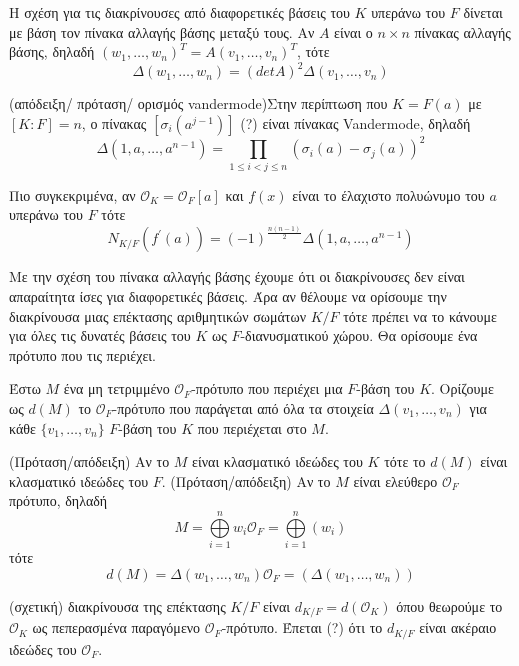 \documentclass[oneside,a4paper]{article}
\newcommand {\tl}{\textlatin}
\begin{document}
Η σχέση για τις διακρίνουσες από διαφορετικές βάσεις του $K$ υπεράνω του $F$ δίνεται με βάση τον πίνακα αλλαγής βάσης μεταξύ τους. Αν $A$ είναι ο $n\times n$ πίνακας αλλαγής βάσης, δηλαδή $(w_1,\ldots,w_n)^T = A (v_1,\ldots,v_n)^T$, τότε $$\Delta(w_1,\ldots,w_n) = (detA)^2 \Delta(v_1,\ldots,v_n)$$


(απόδειξη/ πρόταση/ ορισμός \tl{vandermode})Στην περίπτωση που $K = F(a)$ με $[K:F]=n$, ο πίνακας $[\sigma_i (a^{j-1})]$ (?) είναι πίνακας \tl{Vandermode}, δηλαδή
$$\Delta(1,a,\ldots,a^{n-1}) = \prod\limits_{1\leq i < j \leq n} \left(\sigma_i (a) - \sigma_j (a)\right)^2$$


Πιο συγκεκριμένα, αν $\mathcal{O}_K = \mathcal{O}_F [a]$ και $f(x)$ είναι το έλαχιστο πολυώνυμο του $a$ υπεράνω του $F$ τότε $$N_{K/F} (f^{\prime}(a)) = (-1)^{\frac{n(n-1)}2}\Delta(1,a,\ldots,a^{n-1})$$

Με την σχέση του πίνακα αλλαγής βάσης έχουμε ότι οι διακρίνουσες δεν είναι απαραίτητα ίσες για διαφορετικές βάσεις. Άρα αν θέλουμε να ορίσουμε την διακρίνουσα μιας επέκτασης αριθμητικών σωμάτων $K/F$ τότε πρέπει να το κάνουμε για όλες τις δυνατές βάσεις του $K$ ως $F$-διανυσματικού χώρου. Θα ορίσουμε ένα πρότυπο που τις περιέχει.  

Έστω $M$ ένα μη τετριμμένο $\mathcal{O}_F$-πρότυπο που περιέχει μια $F$-βάση του $K$. Ορίζουμε ως $d(M)$ το $\mathcal{O}_F$-πρότυπο που παράγεται από όλα τα στοιχεία $\Delta (v_1,\ldots,v_n)$ για κάθε $\{v_1,\ldots,v_n\}$ $F$-βάση του $K$ που περιέχεται στο $M$.

(Πρόταση/απόδειξη) Αν το $M$ είναι κλασματικό ιδεώδες του $K$ τότε το $d(M)$ είναι κλασματικό ιδεώδες του $F$.
(Πρόταση/απόδειξη) Αν το $M$ είναι ελεύθερο $\mathcal{O}_F$ πρότυπο, δηλαδή $$M = \bigoplus\limits_{i=1}^n w_i \mathcal{O}_F = \bigoplus\limits_{i=1}^n (w_i)$$ τότε $$d(M) = \Delta (w_1,\ldots,w_n) \mathcal{O}_F = (\Delta (w_1,\ldots,w_n))$$



(σχετική) διακρίνουσα της επέκτασης $K/F$ είναι $d_{K/F} = d(\mathcal{O}_K)$ όπου θεωρούμε το $\mathcal{O}_K$ ως πεπερασμένα παραγόμενο $\mathcal{O}_F$-πρότυπο.  Έπεται (?) ότι το $d_{K/F}$ είναι ακέραιο ιδεώδες του $\mathcal{O}_F$.
\end{document}
